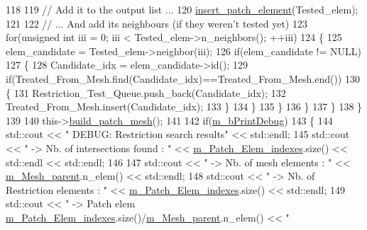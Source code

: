 \begin{DoxyCode}
118 
119                     \textcolor{comment}{// Add it to the output list ...}
120                     \hyperlink{classcarl_1_1_patch__construction_ae7a46ef950445a82cb0036b49b778fbf}{insert\_patch\_element}(Tested\_elem);
121 
122                     \textcolor{comment}{// ... And add its neighbours (if they weren't tested yet)}
123                     \textcolor{keywordflow}{for}(\textcolor{keywordtype}{unsigned} \textcolor{keywordtype}{int} iii = 0; iii < Tested\_elem->n\_neighbors(); ++iii)
124                     \{
125                         elem\_candidate = Tested\_elem->neighbor(iii);
126                         \textcolor{keywordflow}{if}(elem\_candidate != NULL)
127                         \{
128                             Candidate\_idx = elem\_candidate->id();
129                             \textcolor{keywordflow}{if}(Treated\_From\_Mesh.find(Candidate\_idx)==Treated\_From\_Mesh.end())
130                             \{
131                                 Restriction\_Test\_Queue.push\_back(Candidate\_idx);
132                                 Treated\_From\_Mesh.insert(Candidate\_idx);
133                             \}
134                         \}
135                     \}
136                 \}
137             \}
138         \}
139 
140         this->\hyperlink{classcarl_1_1_patch__construction_ab4e5b3f8e8f2a7c0af44979a8b0a39c4}{build\_patch\_mesh}();
141 
142         \textcolor{keywordflow}{if}(\hyperlink{classcarl_1_1_patch__construction_a93158e5a81432eb8f92860552bff37bc}{m\_bPrintDebug})
143         \{
144             std::cout << \textcolor{stringliteral}{"    DEBUG: Restriction search results"} << std::endl;
145             std::cout << \textcolor{stringliteral}{" -> Nb. of intersections found  : "} << 
      \hyperlink{classcarl_1_1_patch__construction_af7db498027d46bff8464757e824404fb}{m\_Patch\_Elem\_indexes}.size() << std::endl << std::endl;
146 
147             std::cout << \textcolor{stringliteral}{" -> Nb. of mesh elements        : "} << \hyperlink{classcarl_1_1_patch__construction_aec2f60b62d5d7b44bfcc4f9ca9de28d2}{m\_Mesh\_parent}.n\_elem() << 
      std::endl;
148             std::cout << \textcolor{stringliteral}{" -> Nb. of Restriction elements : "} << 
      \hyperlink{classcarl_1_1_patch__construction_af7db498027d46bff8464757e824404fb}{m\_Patch\_Elem\_indexes}.size() << std::endl;
149             std::cout << \textcolor{stringliteral}{" -> Patch elem %
      \hyperlink{classcarl_1_1_patch__construction_af7db498027d46bff8464757e824404fb}{m\_Patch\_Elem\_indexes}.size()/\hyperlink{classcarl_1_1_patch__construction_aec2f60b62d5d7b44bfcc4f9ca9de28d2}{m\_Mesh\_parent}.n\_elem() << \textcolor{stringliteral}{" %
}}
\end{DoxyCode}
